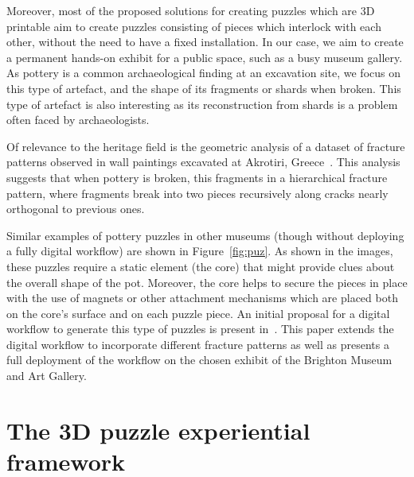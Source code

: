 \documentclass[acmlarge,screen,dvipsnames]{acmart}
\begin{document}
Moreover, most of the proposed solutions for creating puzzles which
are 3D printable aim to create puzzles consisting of pieces which
interlock with each other, without the need to have a fixed
installation. In our case, we aim to create a permanent hands-on
exhibit for a public space, such as a busy museum gallery. As pottery
is a common archaeological finding at an excavation site, we focus on
this type of artefact, 
and the shape of its fragments or shards when broken. 
This type of artefact is also interesting as its
reconstruction from shards is a problem often faced by archaeologists.

Of relevance to the heritage field is the geometric analysis of a
dataset of fracture patterns observed in wall paintings excavated at
Akrotiri, Greece~\cite{Shin:2012:ASF:2362402.2362404}. This analysis
suggests that when pottery is broken, this fragments in a hierarchical
fracture pattern, where fragments break into two pieces recursively
along cracks nearly orthogonal to previous ones.

Similar examples of pottery puzzles in other museums (though without
deploying a fully digital workflow) are shown in
Figure~\ref{fig:puz}. As shown in the images, these puzzles require a
static element (the core) that might provide clues about the overall
shape of the pot. Moreover, the core helps to secure the pieces in
place with the use of magnets or other attachment mechanisms which are
placed both on the core's surface and on each puzzle piece. An initial
proposal for a digital workflow to generate this type of puzzles is
present in~\cite{01763a4734614c50ab9f408cdd0f5470}. This paper extends
the digital workflow to incorporate different fracture patterns as
well as presents a full deployment of the workflow on the chosen 
exhibit of the Brighton Museum and Art Gallery.




\section{The 3D puzzle experiential framework}
\label{requirements}
\end{document}

